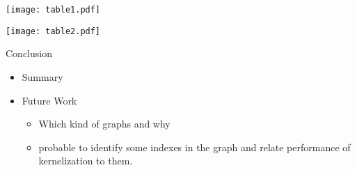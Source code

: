 \documentclass{beamer}
\begin{document}
\begin{frame}
\begin{center}

\texttt{[image: table1.pdf]}

\end{center}
\end{frame}
\begin{frame}
\begin{center}

\texttt{[image: table2.pdf]}

\end{center}
\end{frame}

\begin{frame}{Conclusion}
\begin{itemize}
\item Summary
\item Future Work
\begin{itemize}
\item Which kind of graphs and why
\item probable to identify some indexes in the graph and relate performance of kernelization to them.
\end{itemize}
\end{itemize}

\end{frame}
\end{document}
